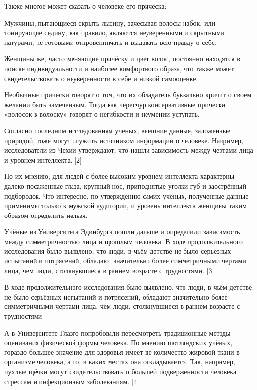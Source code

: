 Также многое может сказать о человеке его причёска:

Мужчины, пытающиеся скрыть лысину, зачёсывая волосы набок, или тонирующие седину, как правило, являются неуверенными и скрытными натурами, не готовыми откровенничать и выдавать всю правду о себе.

Женщины же, часто меняющие причёску и цвет волос, постоянно находятся в поиске индивидуальности и наиболее комфортного образа, что также может свидетельствовать о неуверенности в себе и низкой самооценке.

Необычные прически говорят о том, что их обладатель буквально кричит о своем желании быть замеченным. Тогда как чересчур консервативные прически «волосок к волоску» говорят о негибкости и неумении уступать.

Согласно последним исследованиям учёных, внешние данные, заложенные природой, тоже могут служить источником информации о человеке. Например, исследователи из Чехии утверждают, что нашли зависимость между чертами лица и уровнем интеллекта. [2]

По их мнению, для людей с более высоким уровнем интеллекта характерны далеко посаженные глаза, крупный нос, приподнятые уголки губ и заострённый подбородок.  Что интересно, по утверждению самих учёных, полученные данные применимы только к мужской аудитории, и уровень интеллекта женщины таким образом определить нельзя.

Учёные из Университета Эдинбурга пошли дальше и определили зависимость между симметричностью лица и прошлым человека. В ходе продолжительного исследования было выявлено, что люди, в чьём детстве не было серьёзных испытаний и потрясений, обладают значительно более симметричными чертами лица, чем люди, столкнувшиеся в раннем возрасте с трудностями. [3]

\begin{fancyquotes}
    В ходе продолжительного исследования было выявлено, что люди, в чьём детстве не было серьёзных испытаний и потрясений, обладают значительно более симметричными чертами лица, чем люди, столкнувшиеся в раннем возрасте с трудностями
\end{fancyquotes}

А в Университете Глазго попробовали пересмотреть традиционные методы оценивания физической формы человека. По мнению шотландских учёных, гораздо большее значение для здоровья имеет не количество жировой ткани в организме человека, а то, в каких местах она откладывается. Так, например, пухлые щёчки могут свидетельствовать о большей подверженности человека стрессам и инфекционным заболеваниям. [4]

